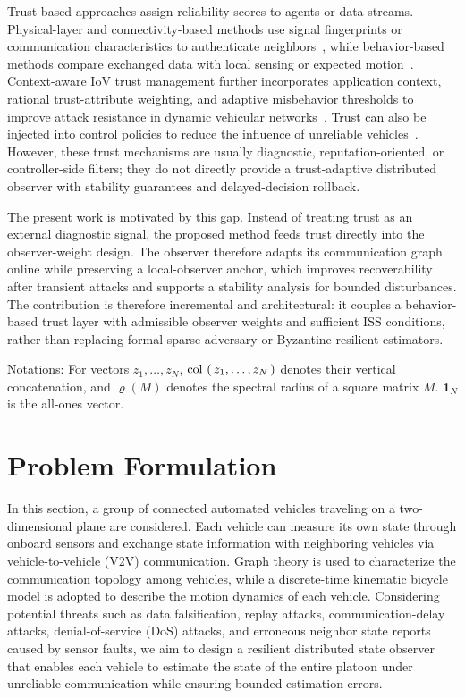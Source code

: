 \documentclass[letterpaper,journal]{IEEEtran}
\def\col#1{\mathop{{\rm col}\,\left(\,#1\,\right)}}
\begin{document}
Trust-based approaches assign reliability scores to agents or data streams. Physical-layer and connectivity-based methods use signal fingerprints or communication characteristics to authenticate neighbors~\cite{trust_physic_connecte,KF_chisquare_meusure}, while behavior-based methods compare exchanged data with local sensing or expected motion~\cite{trust_simple,trust_complex}. Context-aware IoV trust management further incorporates application context, rational trust-attribute weighting, and adaptive misbehavior thresholds to improve attack resistance in dynamic vehicular networks~\cite{siddiqui2023trust_vehicles}. Trust can also be injected into control policies to reduce the influence of unreliable vehicles~\cite{self-belive,Enhancing_control_trust}. However, these trust mechanisms are usually diagnostic, reputation-oriented, or controller-side filters; they do not directly provide a trust-adaptive distributed observer with stability guarantees and delayed-decision rollback.

The present work is motivated by this gap. Instead of treating trust as an external diagnostic signal, the proposed method feeds trust directly into the observer-weight design. The observer therefore adapts its communication graph online while preserving a local-observer anchor, which improves recoverability after transient attacks and supports a stability analysis for bounded disturbances. The contribution is therefore incremental and architectural: it couples a behavior-based trust layer with admissible observer weights and sufficient ISS conditions, rather than replacing formal sparse-adversary or Byzantine-resilient estimators.

Notations: For vectors $z_1,\ldots,z_N$, $\col{z_1,\ldots,z_N}$ denotes their vertical concatenation, and $\varrho(M)$ denotes the spectral radius of a square matrix $M$. $\mathbf{1}_N$ is the all-ones vector.

\section{Problem Formulation}\label{sec_vehiclemodel}

In this section, a group of connected automated vehicles traveling on a two-dimensional plane are considered. Each vehicle can measure its own state through onboard sensors and exchange state information with neighboring vehicles via vehicle-to-vehicle (V2V) communication. Graph theory is used to characterize the communication topology among vehicles, while a discrete-time kinematic bicycle model is adopted to describe the motion dynamics of each vehicle. Considering potential threats such as data falsification, replay attacks, communication-delay attacks, denial-of-service (DoS) attacks, and erroneous neighbor state reports caused by sensor faults, we aim to design a resilient distributed state observer that enables each vehicle to estimate the state of the entire platoon under unreliable communication while ensuring bounded estimation errors.
\end{document}
